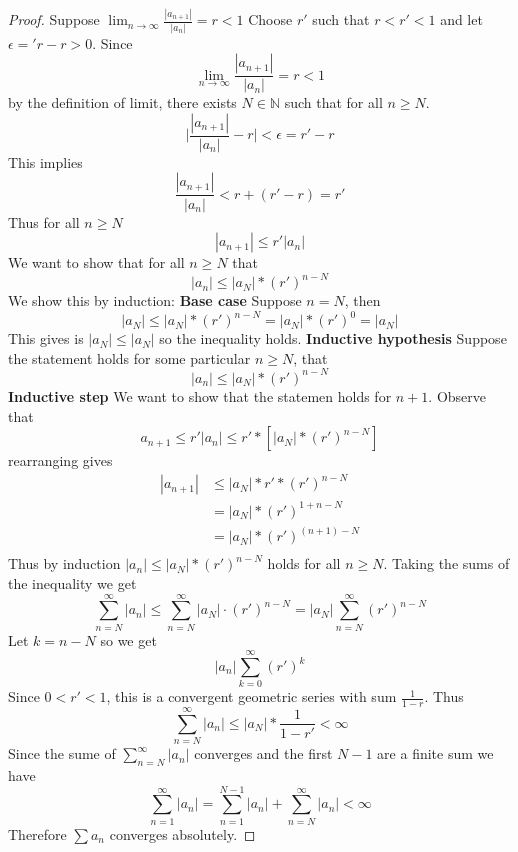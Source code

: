 \documentclass[12pt]{article}
\newcommand{\NN}{\ensuremath{\mathbb N}}
\newcommand{\eps}{\ensuremath{\epsilon}}
\begin{document}
\begin{proof}
Suppose $\lim_{n\to\infty} \frac{|a_{n+1}|}{|a_n|} = r < 1$
\newline
\newline
Choose $r'$ such that $r < r' < 1$ and let $\eps = 'r - r > 0$.
Since
$$\lim_{n\to\infty} \frac{|a_{n+1}|}{|a_n|} = r < 1$$
by the definition of limit, there exists $N \in \NN$ such that for all $n \geq N$.
$$ \mid \frac{|a_{n+1}|}{|a_n|} - r \mid < \eps = r'-r $$
This implies $$\frac{|a_{n+1}|}{|a_n|} < r + (r' - r) = r' $$ 
Thus for all $n \geq N$
$$|a_{n+1}| \leq r'|a_n|$$
We want to show that for all $n \geq N$ that
$$|a_n| \leq |a_N| * (r')^{n-N}$$
We show this by induction:
\newline
\textbf{Base case} Suppose $n = N$, then
$$|a_N| \leq |a_N| * (r')^{n-N} = |a_N| * (r')^0 = |a_N|$$
This gives is $|a_N| \leq |a_N|$ so the inequality holds.
\textbf{Inductive hypothesis} Suppose the statement holds for some particular $n \geq N$, that
$$|a_n| \leq |a_N| * (r')^{n-N}$$
\textbf{Inductive step} We want to show that the statemen holds for $n+1$. Observe that
$$a_{n+1} \leq r'|a_n| \leq r' * [|a_N| * (r')^{n-N}]$$
rearranging gives
\begin{align*}
  |a_{n+1}| & \leq |a_N| * r' * (r')^{n-N} \\
            & = |a_N| * (r')^{1+n-N} \\
            & = |a_N| * (r')^{(n+1)-N} \\
\end{align*}
Thus by induction $|a_n| \leq |a_N| * (r')^{n-N}$ holds for all $n \geq N$.
Taking the sums of the inequality we get
$$\sum_{n=N}^{\infty} |a_n| \le \sum_{n=N}^{\infty} |a_N| \cdot (r')^{n-N} 
= |a_N| \sum_{n=N}^{\infty} (r')^{n-N}$$ 
Let $k = n -N$ so we get
$$|a_n| \sum_{k=0}^\infty (r')^k$$
Since $0 < r' < 1$, this is a convergent geometric series with sum $\frac{1}{1-r}$.
Thus
$$\sum_{n=N}^\infty |a_n| \leq |a_N| * \frac{1}{1-r'} < \infty$$
Since the sume of $\sum_{n=N}^\infty |a_n|$ converges and the first $N-1$ are a finite sum we have
$$\sum_{n=1}^{\infty} |a_n| = \sum_{n=1}^{N-1} |a_n| + \sum_{n=N}^{\infty} |a_n| < \infty$$
Therefore $\sum a_n$ converges absolutely.

\end{proof}
\end{document}
